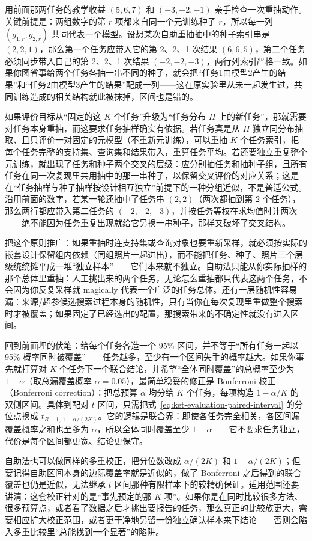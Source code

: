 用前面那两任务的教学收益 $(5,6,7)$ 和 $(-3,-2,-1)$ 亲手检查一次重抽动作。关键前提是：两组数字的第 $r$ 项都来自同一个元训练种子 $r$，所以每一列 $(g_{1,r},g_{2,r})$ 共同代表一个模型。设想某次自助重抽抽中的种子索引串是 $(2,2,1)$，那么第一个任务应带入它的第 2、2、1 次结果 $(6,6,5)$，第二个任务必须同步带入自己的第 2、2、1 次结果 $(-2,-2,-3)$，两行列索引严格一致。如果你图省事给两个任务各抽一串不同的种子，就会把“任务1由模型2产生的结果”和“任务2由模型3产生的结果”配成一列——这在原实验里从未一起发生过，共同训练造成的相关结构就此被抹掉，区间也是错的。

如果评价目标从“固定的这 $K$ 个任务”升级为“任务分布 $\Pi$ 上的新任务”，那就需要对任务本身重抽，而这要求任务抽样确实有依据。若任务真是从 $\Pi$ 独立同分布抽取、且只评价一对固定的元模型（不重新元训练），可以重抽 $K$ 个任务索引，把每个任务完整的支持集、查询集和结果带入，重算任务平均。若还要独立重复整个元训练，就出现了任务和种子两个交叉的层级：应分别抽任务和抽种子组，且所有任务在同一次复现里共用抽中的那一串种子，以保留交叉评价的对应关系；这是在“任务抽样与种子抽样按设计相互独立”前提下的一种分组近似，不是普适公式。沿用前面的数字，若某一轮还抽中了任务串 $(2,2)$（两次都抽到第 2 个任务），那么两行都应带入第二任务的 $(-2,-2,-3)$，并按任务等权在求均值时计两次——绝不能因为任务重复出现就给它另换一串种子，那样又破坏了交叉结构。

把这个原则推广：如果重抽时连支持集或查询对象也要重新采样，就必须按实际的嵌套设计保留组内依赖（同组照片一起进出），而不能把任务、种子、照片三个层级统统摊平成一堆“独立样本”——它们本来就不独立。自助法只能从你实际抽样的那个总体里重抽：人工挑出来的两个任务，无论怎么重抽都只代表这两个任务，不会因为你反复采样就 magically 代表一个广泛的任务总体。还有一层随机性容易漏：来源/超参候选搜索过程本身的随机性，只有当你在每次复现里重做整个搜索时才被覆盖；如果固定了已经选出的配置，那搜索带来的不确定性就没有进入区间。

回到前面埋的伏笔：给每个任务各造一个 95\% 区间，并不等于“所有任务一起以 95\% 概率同时被覆盖”——任务越多，至少有一个区间失手的概率越大。如果你事先就打算对 $K$ 个任务下一个联合结论，并希望“全体同时覆盖”的总概率至少为 $1-\alpha$（取总漏覆盖概率 $\alpha=0.05$），最简单稳妥的修正是 Bonferroni 校正（Bonferroni correction）：把总预算 $\alpha$ 均分给 $K$ 个任务，每项构造 $1-\alpha/K$ 的双侧区间。具体到配对 $t$ 区间，只需把式~\eqref{eq:ket-evaluation-paired-interval} 的分位点换成 $t_{R-1,\,1-\alpha/(2K)}$。它的逻辑是联合界：即使各任务完全相关，各区间漏覆盖概率之和也至多为 $\alpha$，所以全体同时覆盖至少 $1-\alpha$——它不要求任务独立，代价是每个区间都更宽、结论更保守。

自助法也可以做同样的多重校正，把分位数改成 $\alpha/(2K)$ 和 $1-\alpha/(2K)$；但要记得自助区间本身的边际覆盖率就是近似的，做了 Bonferroni 之后得到的联合覆盖也仍是近似，无法继承 $t$ 区间那种有限样本下的较精确保证。适用范围还要讲清：这套校正针对的是“事先预定的那 $K$ 项”。如果你是在同时比较很多方法、很多预算点，或者看了数据之后才挑出要报告的任务，那么真正的比较族更大，需要相应扩大校正范围，或者更干净地另留一份独立确认样本来下结论——否则会陷入多重比较里“总能找到一个显著”的陷阱。

